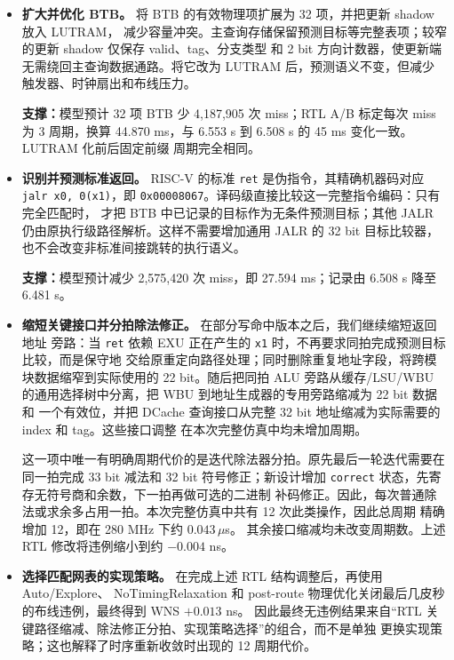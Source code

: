\documentclass[UTF8,a4paper,12pt]{ctexart}
\newcommand{\code}[1]{\texttt{#1}}
\begin{document}
\begin{itemize}
  \item \textbf{扩大并优化 BTB。} 将 BTB 的有效物理项扩展为 32 项，并把更新 shadow 放入 LUTRAM，
  减少容量冲突。主查询存储保留预测目标等完整表项；较窄的更新 shadow 仅保存 valid、tag、分支类型
  和 2 bit 方向计数器，使更新端无需绕回主查询数据通路。将它改为 LUTRAM 后，预测语义不变，但减少
  触发器、时钟扇出和布线压力。
  \par\noindent\textbf{支撑：}{\kaishu 模型预计 32 项 BTB 少 4,187,905 次 miss；RTL A/B 标定每次
  miss 为 3 周期，换算 44.870 ms，与 6.553 s 到 6.508 s 的 45 ms 变化一致。LUTRAM 化前后固定前缀
  周期完全相同。}
  \item \textbf{识别并预测标准返回。} RISC-V 的标准 \code{ret} 是伪指令，其精确机器码对应
  \code{jalr x0, 0(x1)}，即 \code{0x00008067}。译码级直接比较这一完整指令编码：只有完全匹配时，
  才把 BTB 中已记录的目标作为无条件预测目标；其他 JALR 仍由原执行级路径解析。这样不需要增加通用
  JALR 的 32 bit 目标比较器，也不会改变非标准间接跳转的执行语义。
  \par\noindent\textbf{支撑：}{\kaishu 模型预计减少 2,575,420 次 miss，即 27.594 ms；记录由
  6.508 s 降至 6.481 s。}
  \item \textbf{缩短关键接口并分拍除法修正。} 在部分写命中版本之后，我们继续缩短返回地址
  旁路：当 \code{ret} 依赖 EXU 正在产生的 \code{x1} 时，不再要求同拍完成预测目标比较，而是保守地
  交给原重定向路径处理；同时删除重复地址字段，将跨模块数据缩窄到实际使用的 22 bit。随后把同拍
  ALU 旁路从缓存/LSU/WBU 的通用选择树中分离，把 WBU 到地址生成器的专用旁路缩减为 22 bit 数据和
  一个有效位，并把 DCache 查询接口从完整 32 bit 地址缩减为实际需要的 index 和 tag。这些接口调整
  在本次完整仿真中均未增加周期。

  这一项中唯一有明确周期代价的是迭代除法器分拍。原先最后一轮迭代需要在同一拍完成 33 bit 减法和
  32 bit 符号修正；新设计增加 \code{correct} 状态，先寄存无符号商和余数，下一拍再做可选的二进制
  补码修正。因此，每次普通除法或求余多占用一拍。本次完整仿真中共有 12 次此类操作，因此总周期
  精确增加 12，即在 280 MHz 下约 $0.043\,\mu$s。
  其余接口缩减均未改变周期数。上述 RTL 修改将违例缩小到约 $-0.004$ ns。
  \item \textbf{选择匹配网表的实现策略。} 在完成上述 RTL 结构调整后，再使用 Auto/Explore、
  NoTimingRelaxation 和 post-route 物理优化关闭最后几皮秒的布线违例，最终得到 WNS $+0.013$ ns。
  因此最终无违例结果来自“RTL 关键路径缩减、除法修正分拍、实现策略选择”的组合，而不是单独
  更换实现策略；这也解释了时序重新收敛时出现的 12 周期代价。
\end{itemize}
\end{document}

